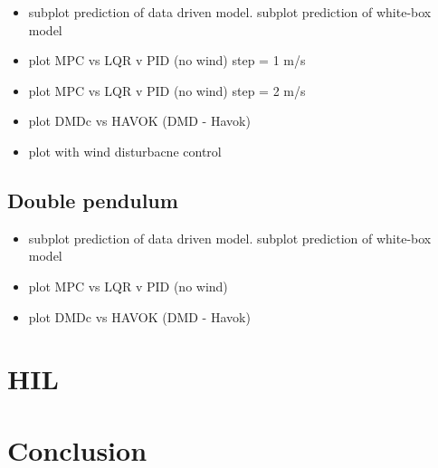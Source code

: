             \begin{itemize}
                \item subplot prediction of data driven model. subplot prediction of white-box model
                \item plot MPC vs LQR v PID (no wind) step = 1 m/s
                \item plot MPC vs LQR v PID (no wind) step = 2 m/s
                \item plot DMDc vs HAVOK (DMD - Havok)
                \item plot with wind disturbacne control
            \end{itemize}

        \FloatBarrier\subsection{Double pendulum}

            \begin{itemize}
                \item subplot prediction of data driven model. subplot prediction of white-box model
                \item plot MPC vs LQR v PID (no wind)
                \item plot DMDc vs HAVOK (DMD - Havok)
            \end{itemize}

    \section{HIL}

    \section{Conclusion}


